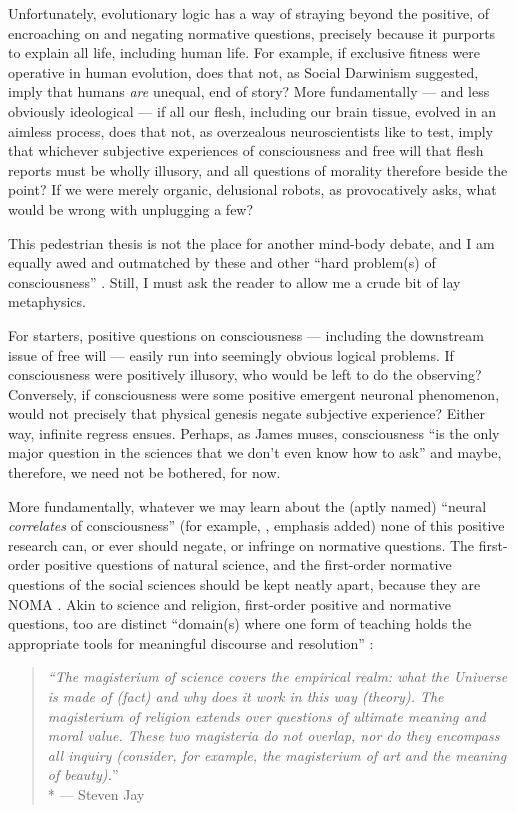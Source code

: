 Unfortunately, evolutionary logic has a way of straying beyond the positive, of encroaching on and negating normative questions, precisely because it purports to explain all life, including human life. 
For example, if exclusive fitness were operative in human evolution, does that not, as Social Darwinism suggested, imply that humans \emph{are} unequal, end of story? 
More fundamentally --- and less obviously ideological --- if all our flesh, including our brain tissue, evolved in an aimless process, does that not, as overzealous neuroscientists like to test, imply that whichever subjective experiences of consciousness and free will that flesh reports must be wholly illusory, and all questions of morality therefore beside the point? 
If we were merely organic, delusional robots, as \citet[Chapter 23]{Wright2000} provocatively asks, what would be wrong with unplugging a few?

This pedestrian thesis is not the place for another mind-body debate, and I am equally awed and outmatched by these and other ``hard problem(s) of consciousness''  \citep{Chalmers1995}. 
Still, I must ask the reader to allow me a crude bit of lay metaphysics. 

For starters, positive questions on consciousness --- including the downstream issue of free will --- easily run into seemingly obvious logical problems. 
If consciousness were positively illusory, who would be left to do the observing? 
Conversely, if consciousness were some positive emergent neuronal phenomenon, would not precisely that physical genesis negate subjective experience? 
Either way, infinite regress ensues. Perhaps, as James \citeauthor{Trefil1997} muses, consciousness ``is the only major question in the sciences that we don't even know how to ask'' \citeyearpar[15]{Trefil1997} and maybe, therefore, we need not be bothered, for now.

More fundamentally, whatever we may learn about the (aptly named) ``neural \emph{correlates} of consciousness'' (for example, \citealt{Koch2004}, emphasis added) none of this positive research can, or ever should negate, or infringe on normative questions. 
The first-order positive questions of natural science, and the first-order normative questions of the social sciences should be kept neatly apart, because they are \gls{NOMA} \citep{Gould1997}. 
Akin to science and religion, first-order positive and normative questions, too are distinct ``domain(s) where one form of teaching holds the appropriate tools for meaningful discourse and resolution'' \citep[3]{Gould2002}: 
\begin{quote}
	\emph{``The magisterium of science covers the empirical realm: what the Universe is made of (fact) and why does it work in this way (theory). The magisterium of religion extends over questions of ultimate meaning and moral value. These two magisteria do not overlap, nor do they encompass all inquiry (consider, for example, the magisterium of art and the meaning of beauty).}''\\*
	--- Steven Jay \citet[6]{Gould2002} %
\end{quote} 


